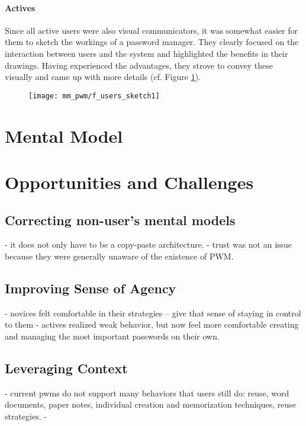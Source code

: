 \paragraph{Actives} Since all active users were also visual communicators, it was somewhat easier for them to sketch the workings of a password manager. They clearly focused on the interaction between users and the system and highlighted the benefits in their drawings. Having experienced the advantages, they strove to convey these visually and came up with more details (cf. Figure \ref{fig:mm_pwm:f_actives_sketch1}). 
\begin{figure}
	\centering
	\texttt{[image: mm\_pwm/f\_users\_sketch1]}
	\caption{\label{fig:mm_pwm:f_actives_sketch1}}
\end{figure}

\section{Mental Model}\label{ref:mm_pwm:mm-description}

\section{Opportunities and Challenges}
\subsection{Correcting non-user's mental models}
- it does not only have to be a copy-paste architecture.
- trust was not an issue because they were generally unaware of the existence of PWM.

\subsection{Improving Sense of Agency}
- novices felt comfortable in their strategies -- give that sense of staying in control to them
- actives realized weak behavior, but now feel more comfortable creating and managing the most important passwords on their own. 

\subsection{Leveraging Context}
- current pwms do not support many behaviors that users still do: reuse, word documents, paper notes, individual creation and memorization techniques, reuse strategies. 
-  

